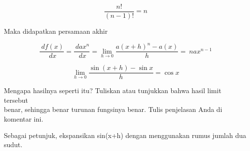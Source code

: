 \documentclass{article}
\begin{document}
\begin{eulernotebook}
\begin{eulercomment}
\begin{eulercomment}
\begin{eulercomment}
\end{eulercomment}
\begin{eulerformula}
\[
\frac{n!}{(n-1)!}=n
\]
\end{eulerformula}
\begin{eulercomment}
Maka didapatkan persamaan akhir

\end{eulercomment}
\begin{eulerformula}
\[
\frac{\ df(x)}{\ dx} = \frac{\ dax^{n}}{\ dx}= \lim_{h\to 0} \frac{a(x+h)^{n}-a(x)}{h} = \ n ax^{n-1}
\]
\end{eulerformula}
\begin{eulercomment}
\end{eulercomment}
\eulersubheading{}
\begin{eulerformula}
\[
\lim_{h\rightarrow 0}{\frac{\sin \left(x+h\right)-\sin x}{h}}=\cos   x
\]
\end{eulerformula}
\begin{eulercomment}
Mengapa hasilnya seperti itu? Tuliskan atau tunjukkan bahwa hasil
limit tersebut\\
benar, sehingga benar turunan fungsinya benar.  Tulis penjelasan Anda
di komentar ini.

Sebagai petunjuk, ekspansikan sin(x+h) dengan menggunakan rumus jumlah
dua sudut.


\end{eulercomment}
\end{eulercomment}
\end{eulercomment}
\end{eulernotebook}
\end{document}
